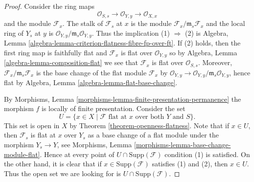 \documentclass[10pt,a4paper]{amsart}
\theoremstyle{plain}
\theoremstyle{definition}
\theoremstyle{remark}
\numberwithin{equation}{subsection}
\begin{document}
\begin{proof}
Consider the ring maps
$$
\mathcal{O}_{S, s} \longrightarrow
\mathcal{O}_{Y, y} \longrightarrow \mathcal{O}_{X, x}
$$
and the module $\mathcal{F}_x$. The stalk of $\mathcal{F}_s$ at $x$
is the module $\mathcal{F}_x/\mathfrak m_s \mathcal{F}_x$ and
the local ring of $Y_s$ at $y$ is
$\mathcal{O}_{Y, y}/\mathfrak m_s \mathcal{O}_{Y, y}$.
Thus the implication (1) $\Rightarrow$ (2) is
Algebra, Lemma \ref{algebra-lemma-criterion-flatness-fibre-fp-over-ft}.
If (2) holds, then the first ring map is faithfully flat
and $\mathcal{F}_x$ is flat over $\mathcal{O}_{Y, y}$ so by
Algebra, Lemma \ref{algebra-lemma-composition-flat}
we see that $\mathcal{F}_x$ is flat over $\mathcal{O}_{S, s}$.
Moreover, $\mathcal{F}_x/\mathfrak m_s \mathcal{F}_x$ is the
base change of the flat module $\mathcal{F}_x$ by
$\mathcal{O}_{Y, y} \to \mathcal{O}_{Y, y}/\mathfrak m_s \mathcal{O}_{Y, y}$,
hence flat by
Algebra, Lemma \ref{algebra-lemma-flat-base-change}.

\medskip\noindent
By
Morphisms, Lemma \ref{morphisms-lemma-finite-presentation-permanence}
the morphism $f$ is locally of finite presentation.
Consider the set
\begin{equation}
\label{equation-open}
U = \{x \in X \mid \mathcal{F} \text{ flat at }x
\text{ over both }Y\text{ and }S\}.
\end{equation}
This set is open in $X$ by
Theorem \ref{theorem-openness-flatness}.
Note that if $x \in U$, then $\mathcal{F}_s$ is flat at
$x$ over $Y_s$ as a base change of a flat module under the
morphism $Y_s \to Y$, see
Morphisms, Lemma \ref{morphisms-lemma-base-change-module-flat}.
Hence at every point of $U \cap \text{Supp}(\mathcal{F})$
condition (1) is satisfied. On the other hand, it is
clear that if $x \in \text{Supp}(\mathcal{F})$ satisfies
(1) and (2), then $x \in U$. Thus the open set we are
looking for is $U \cap \text{Supp}(\mathcal{F})$.
\end{proof}
\end{document}

